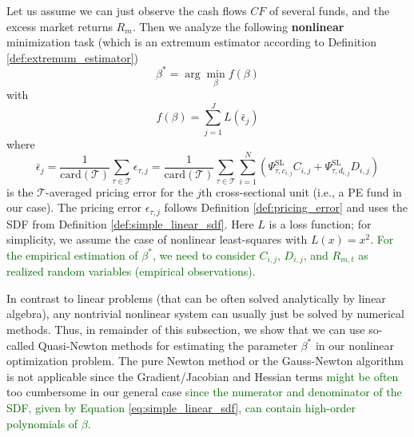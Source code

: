 Let us assume we can just observe the cash flows $CF$ of several funds, and the excess market returns $R_m$.
Then we analyze the following \textbf{nonlinear} minimization task (which is an extremum estimator according to Definition \ref{def:extremum_estimator})
\[
\beta^* = \arg \min_{\beta} f(\beta)
\]
with 
\[
f(\beta) = \sum_{j=1}^J L \left( \bar{\epsilon}_{j} \right)
\]
where
\[
\bar{\epsilon}_{j} =
\frac{1}{\mathrm{card}(\mathcal{T})} \sum_{\tau \in \mathcal{T}} \epsilon_{\tau,j}
=
\frac{1}{\mathrm{card}(\mathcal{T})} \sum_{\tau \in \mathcal{T}}
\sum_{i=1}^N \left( \Psi_{\tau,c_{i,j}}^{\mathrm{SL}} C_{i,j} + \Psi_{\tau,d_{i,j}}^{\mathrm{SL}} D_{i,j} \right)
\]
is the $\mathcal{T}$-averaged pricing error for the $j$th cross-sectional unit (i.e., a PE fund in our case).
The pricing error $\epsilon_{\tau,j}$ follows Definition \ref{def:pricing_error} and uses the SDF from Definition \ref{def:simple_linear_sdf}.
Here $L$ is a loss function; for simplicity, we assume the case of nonlinear least-squares with $L(x)=x^2$.
\textcolor{darkgreen}{
	For the empirical estimation of $\beta^*$, we need to consider $C_{i,j}$, $D_{i,j}$, and $R_{m,t}$ as realized random variables (empirical observations).
}

In contrast to linear problems (that can be often solved analytically by linear algebra), any nontrivial nonlinear system can usually just be solved by numerical methods.
Thus, in remainder of this subsection, we show that we can use so-called Quasi-Newton methods for estimating the parameter $\beta^*$ in our nonlinear optimization problem.
The pure Newton method or the Gauss-Newton algorithm is not applicable since the Gradient/Jacobian and Hessian terms \textcolor{darkgreen}{might be often} too cumbersome in our general case \textcolor{darkgreen}{since the numerator and denominator of the SDF, given by Equation \ref{eq:simple_linear_sdf}, can contain high-order polynomials of $\beta$.}

\iffalse
\textcolor{orange}{
	\begin{exercise}
		Q: Is there theoretically a closed-form solution that is just also too cumbersome to calculate? \\
		A: In contrast to linear problems (that can be often solved analytically by linear algebra), any nontrivial nonlinear system can usually just be solved by numerical methods.
	\end{exercise}
}
\fi

